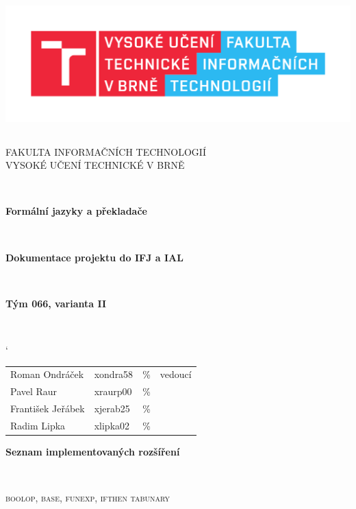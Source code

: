 \documentclass[12pt]{article}
\begin{document}
\begin{titlepage}
	\begin{center}

		\includegraphics[height = 150pt]{img/FIT_barevne_CMYK_CZ.pdf} \\

		\begin{LARGE}
			\textsc{FAKULTA INFORMAČNÍCH TECHNOLOGIÍ} \\
			\textsc{VYSOKÉ UČENÍ TECHNICKÉ V BRNĚ}
		\end{LARGE}
		\\[5mm]
		
		\begin{LARGE}
			\textbf{Formální jazyky a překladače} 
		\end{LARGE}
        \\[20mm]
		\begin{Large}
				\textbf{Dokumentace projektu do IFJ a IAL} 
		\end{Large}
		\\[20mm]
		\begin{Large}
				\textbf{Tým 066, varianta II} 
		\end{Large}
		\\[20mm]
\begin{table}[h]
\centering
\begin{large}	
\catcode`
    \begin{tabular}{l l l l}
         Roman Ondráček & xondra58 & \% & vedoucí\\
         Pavel Raur & xraurp00 & \% &\\
         František Jeřábek & xjerab25 & \% &\\
         Radim Lipka & xlipka02 & \% & 
    \end{tabular}
\end{large}
\end{table}
\vfill
\begin{Large}
				\textbf{Seznam implementovaných rozšíření}
\end{Large}
\\[5mm]
\begin{Large}
			    \textsc{boolop, base, funexp, ifthen tabunary} 
\end{Large}
\end{center}
\end{titlepage}
\end{document}
